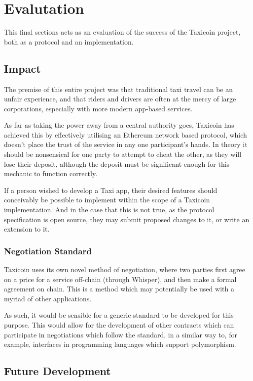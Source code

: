 \section{Evalutation}

This final sections acts as an evaluation of the success of the Taxicoin project, both as a protocol and an implementation.

\subsection{Impact}

The premise of this entire project was that traditional taxi travel can be an unfair experience, and that riders and drivers are often at the mercy of large corporations, especially with more modern app-based services.

As far as taking the power away from a central authority goes, Taxicoin has achieved this by effectively utilising an Ethereum network based protocol, which doesn't place the trust of the service in any one participant's hands. In theory it should be nonsensical for one party to attempt to cheat the other, as they will lose their deposit, although the deposit must be significant enough for this mechanic to function correctly.

If a person wished to develop a Taxi app, their desired features should conceivably be possible to implement within the scope of a Taxicoin implementation. And in the case that this is not true, as the protocol specification is open source, they may submit proposed changes to it, or write an extension to it.

\subsubsection{Negotiation Standard}

Taxicoin uses its own novel method of negotiation, where two parties first agree on a price for a service off-chain (through Whisper), and then make a formal agreement on chain. This is a method which may potentially be used with a myriad of other applications.

As such, it would be sensible for a generic standard to be developed for this purpose. This would allow for the development of other contracts which can participate in negotiations which follow the standard, in a similar way to, for example, interfaces in programming languages which support polymorphism.

\subsection{Future Development}


